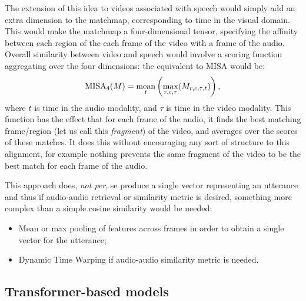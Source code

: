 The extension of this idea to videos associated with speech would
simply add an extra dimension to the matchmap, corresponding to time
in the visual domain. This would make the matchmap a four-dimensional
tensor, specifying the affinity between each region of the each frame
of the video with a frame of the audio. Overall similarity between
video and speech would involve a scoring function aggregating over
the four dimensions: the equivalent to MISA would be:
\begin{equation}
  \label{eq:misa4}
  \mathrm{MISA}_4(M) = \operatorname*{mean}_t \left(\max_{r,c,\tau}(M_{r,c,\tau,t})\right),
\end{equation}
where $t$ is time in the audio modality, and $\tau$ is time in the
video modality. This function has the effect that for each frame of
the audio, it finds the best matching frame/region (let us call this
{\it fragment}) of the video, and averages over the scores of these
matches. It does this without encouraging any sort of structure to
this alignment, for example nothing prevents the same fragment of the
video to be the best match for each frame of the audio.

This approach does, \textit{not per}, se produce a single vector
representing an utterance and thus if audio-audio retrieval or
similarity metric is desired, something more complex than a simple
cosine similarity would be needed:

\begin{itemize}
  \label{itemize:pool}
\item Mean or max pooling of features across frames in order to obtain
  a single vector for the utterance;
\item Dynamic Time Warping if audio-audio similarity metric is needed.
\end{itemize}



\subsection{Transformer-based models}

